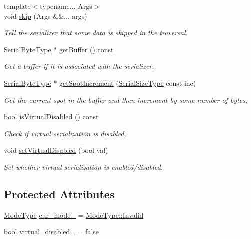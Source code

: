 \begin{DoxyCompactItemize}
{\footnotesize template$<$typename... Args$>$ }\\void \hyperlink{structcheckpoint_1_1_base_serializer_a375bc80d210beae8ffd46229e800e3a0}{skip} (Args \&\&... args)
\begin{DoxyCompactList}\small\item\em Tell the serializer that some data is skipped in the traversal. \end{DoxyCompactList}\item 
\hyperlink{namespacecheckpoint_ae57f01cdc0b81776c23b6c7c934c58f5}{Serial\+Byte\+Type} $\ast$ \hyperlink{structcheckpoint_1_1_base_serializer_a09da55de0edbc77e33c2a29b374ebdc1}{get\+Buffer} () const
\begin{DoxyCompactList}\small\item\em Get a buffer if it is associated with the serializer. \end{DoxyCompactList}\item 
\hyperlink{namespacecheckpoint_ae57f01cdc0b81776c23b6c7c934c58f5}{Serial\+Byte\+Type} $\ast$ \hyperlink{structcheckpoint_1_1_base_serializer_a2b6d088bf58d9c77f12a959763bb307b}{get\+Spot\+Increment} (\hyperlink{namespacecheckpoint_a083f6674da3f94c2901b18c6d238217c}{Serial\+Size\+Type} const inc)
\begin{DoxyCompactList}\small\item\em Get the current spot in the buffer and then increment by some number of bytes. \end{DoxyCompactList}\item 
bool \hyperlink{structcheckpoint_1_1_base_serializer_a5325585631201d413d7992e8916d6f57}{is\+Virtual\+Disabled} () const
\begin{DoxyCompactList}\small\item\em Check if virtual serialization is disabled. \end{DoxyCompactList}\item 
void \hyperlink{structcheckpoint_1_1_base_serializer_ab16e2ffa62f03f8410b116c637bd4adc}{set\+Virtual\+Disabled} (bool val)
\begin{DoxyCompactList}\small\item\em Set whether virtual serialization is enabled/disabled. \end{DoxyCompactList}\end{DoxyCompactItemize}
\subsection*{Protected Attributes}
\begin{DoxyCompactItemize}
\item 
\hyperlink{namespacecheckpoint_ae2509499ccd8b1dc48fb535bf8aa3059}{Mode\+Type} \hyperlink{structcheckpoint_1_1_base_serializer_a1755296c5fbd3cdc5df3390d20c80fae}{cur\+\_\+mode\+\_\+} = \hyperlink{namespacecheckpoint_ae2509499ccd8b1dc48fb535bf8aa3059a4bbb8f967da6d1a610596d7257179c2b}{Mode\+Type\+::\+Invalid}
\item 
bool \hyperlink{structcheckpoint_1_1_base_serializer_acdffc3101eb51baafe4a13939ba23e70}{virtual\+\_\+disabled\+\_\+} = false
\end{DoxyCompactItemize}


